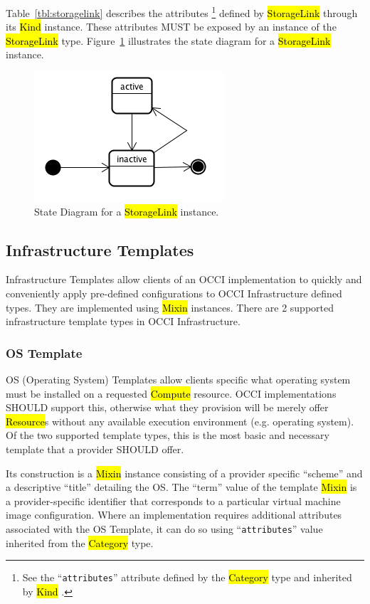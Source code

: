 \documentclass[10pt,a4paper]{article}
\begin{document}
Table~\ref{tbl:storagelink} describes the attributes%
\footnote{See the ``{\tt attributes}'' attribute defined by the \hl{Category}
type and inherited by \hl{Kind} \cite{occi:core}.} 
defined by \hl{StorageLink} through its \hl{Kind} instance. These attributes
MUST be exposed by an instance of the \hl{StorageLink} type. 
Figure~\ref{fig:storagelink_state} illustrates the state diagram for a \hl{StorageLink} instance.

\begin{figure}[!h]
	\centering
	\includegraphics[scale=0.4]{figs/infra-link-state.png}
	\caption{State Diagram for a \hl{StorageLink} instance.}
	\label{fig:storagelink_state}
\end{figure}

\subsection{Infrastructure Templates}
Infrastructure Templates allow clients of an OCCI implementation to quickly and conveniently apply 
pre-defined configurations to OCCI Infrastructure defined types. They are implemented using
\hl{Mixin} instances. There are 2 supported infrastructure template types in OCCI Infrastructure.

\subsubsection{OS Template}
OS (Operating System) Templates allow clients specific what operating system must be installed on a
requested \hl{Compute} resource. OCCI implementations SHOULD support this, otherwise what they 
provision will be merely offer \hl{Resource}s without any available execution environment 
(e.g. operating system). Of the two supported template types, this is the most basic 
and necessary template that a provider SHOULD offer. 

Its construction is a \hl{Mixin} instance consisting of a provider specific ``scheme'' and a descriptive ``title'' 
detailing the OS. The ``term'' value of the template \hl{Mixin} is a provider-specific identifier that 
corresponds to a particular virtual machine image configuration. Where an implementation requires 
additional attributes associated with the OS Template, it can do so using ``{\tt attributes}'' value
inherited from the \hl{Category} type.
\end{document}
